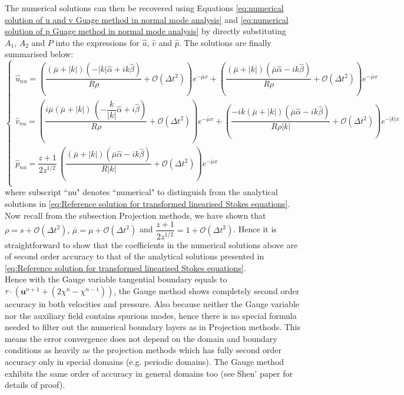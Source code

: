 The numerical solutions can then be recovered using Equations \eqref{eq:numerical solution of u and v Guage method in normal mode analysis} and \eqref{eq:numerical solution of p Guage method in normal mode analysis} by directly substituting $A_1,\,A_2$ and $P$ into the expressions for $\hat{u}, \,\hat{v}$ and $\hat{p}$. The solutions are finally summarised below:
\begin{equation}
\begin{cases}
\hat{u}_{nu} = \left(\dfrac{(\bar{\mu}+|k|)(-|k|\hat{\alpha}+ik\hat{\beta})}{R\rho} + \mathcal{O}(\Delta t^2) \right)e^{-\bar{\mu}x} + \left(\dfrac{(\bar{\mu} + |k|)(\bar{\mu}\hat{\alpha} - ik\hat{\beta})}{R\rho} + \mathcal{O}(\Delta t^2) \right)e^{-\bar{\mu}x}\\
\hat{v}_{nu} =  \left(\dfrac{i\bar{\mu}(\bar{\mu} + |k|)\,\left(- \dfrac{k}{|k|}\hat{\alpha}+i\hat{\beta}\right)}{R\rho} +\mathcal{O}(\Delta t^2)\right) e^{-\bar{\mu} x} +  \left(\dfrac{-ik(\bar{\mu} + |k|)(\bar{\mu}\hat{\alpha} - ik\hat{\beta})}{R\rho|k|} +\mathcal{O}(\Delta t^2)\right) e^{- |k| x} \\
\hat{p}_{nu} = \dfrac{z+1}{2z^{1/2}}\,\left(\dfrac{(\bar{\mu} + |k|)(\bar{\mu}\hat{\alpha} - ik\hat{\beta})}{R|k|} + \mathcal{O}(\Delta t^2) \right)e^{-\bar{\mu}x}\\
\end{cases}
\end{equation}
where subscript ``nu" denotes ``numerical" to distinguish from the analytical solutions in \eqref{eq:Reference solution for transformed linearised Stokes equations}.\\

Now recall from the subsection Projection methods, we have shown that $\rho = s + \mathcal{O} (\Delta t^2), \, \bar{\mu} = \mu + \mathcal{O} (\Delta t^2)$ and $\dfrac{z+1}{2z^{1/2}} = 1 + \mathcal{O} (\Delta t^2)$. Hence it is straightforward to show that the coefficients in the numerical solutions above are of second order accuracy to that of the analytical solutions presented in \eqref{eq:Reference solution for transformed linearised Stokes equations}.\\

Hence with the Gauge variable tangential boundary equals to $\textbf{$\tau$}\cdot\left(\textbf{u}^{n+1} + (2\chi^n - \chi^{n-1})\right)$, the Gauge method shows completely second order accuracy in both velocities and pressure. Also because neither the Gauge variable nor the auxiliary field contains spurious modes, hence there is no special formula needed to filter out the numerical boundary layers as in Projection methods. This means the error convergence does not depend on the domain and boundary conditions as heavily as the projection methods which has fully second order accuracy only in special domains (e.g. periodic domains). The Gauge method exhibits the same order of accuracy in general domains too (see Shen' paper \cite{pyo2005normal,guermond2006overview} for details of proof).

